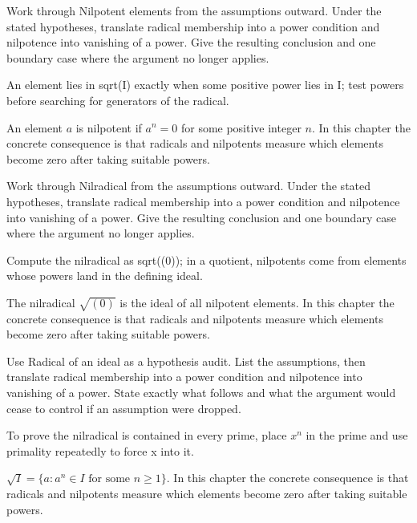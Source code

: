 \begin{exercise}\label{exr:v03-01}
Work through Nilpotent elements from the assumptions outward. Under the stated hypotheses, translate radical membership into a power condition and nilpotence into vanishing of a power. Give the resulting conclusion and one boundary case where the argument no longer applies.
\end{exercise}
\begin{hint}
An element lies in sqrt(I) exactly when some positive power lies in I; test powers before searching for generators of the radical.
\end{hint}
\begin{solution}
An element $a$ is nilpotent if $a^n=0$ for some positive integer $n$. In this chapter the concrete consequence is that radicals and nilpotents measure which elements become zero after taking suitable powers.
\end{solution}

\begin{exercise}\label{exr:v03-02}
Work through Nilradical from the assumptions outward. Under the stated hypotheses, translate radical membership into a power condition and nilpotence into vanishing of a power. Give the resulting conclusion and one boundary case where the argument no longer applies.
\end{exercise}
\begin{hint}
Compute the nilradical as sqrt((0)); in a quotient, nilpotents come from elements whose powers land in the defining ideal.
\end{hint}
\begin{solution}
The nilradical $\sqrt{(0)}$ is the ideal of all nilpotent elements. In this chapter the concrete consequence is that radicals and nilpotents measure which elements become zero after taking suitable powers.
\end{solution}

\begin{exercise}\label{exr:v03-03}
Use Radical of an ideal as a hypothesis audit. List the assumptions, then translate radical membership into a power condition and nilpotence into vanishing of a power. State exactly what follows and what the argument would cease to control if an assumption were dropped.
\end{exercise}
\begin{hint}
To prove the nilradical is contained in every prime, place \(x^n\) in the prime and use primality repeatedly to force x into it.
\end{hint}
\begin{solution}
$\sqrt I=\{a:a^n\in I\text{ for some }n\ge1\}$. In this chapter the concrete consequence is that radicals and nilpotents measure which elements become zero after taking suitable powers.
\end{solution}

